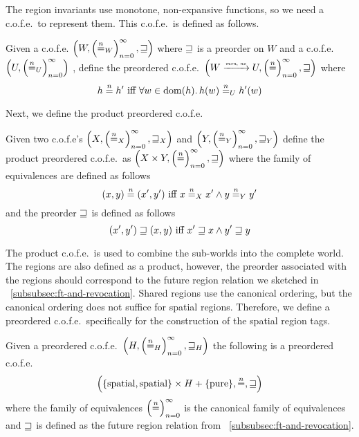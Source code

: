 \begin{jversion}
The region invariants use monotone, non-expansive functions, so we need a c.o.f.e.\ to represent them.
This c.o.f.e.\ is defined as follows.
\begin{lemma}
  Given a c.o.f.e. $\left(W,\left(\nequal[n]_W\right)_{n=0}^{\infty}, \future\right)$ where $\future$ is a preorder on $W$ and a c.o.f.e.\ $\left(U,\left(\nequal[n]_U\right)_{n=0}^{\infty}\right)$ , define the preordered c.o.f.e.\ $\left(W \monnefun U,\left(\nequal[n]\right)_{n=0}^{\infty}, \future \right)$ where 
  \[
    h \nequal h' \text{ iff } \forall w \in \dom(h) \ldotp h(w) \nequal_U h'(w)
  \]
\end{lemma}
Next, we define the product preordered c.o.f.e.\
\begin{lemma}
  Given two c.o.f.e's $\left(X, \left(\nequal_X\right)_{n=0}^{\infty}, \future_X \right)$ and $\left(Y, \left(\nequal_Y\right)_{n=0}^{\infty}, \future_Y \right)$ define the product preordered c.o.f.e.\ as $\left(X \times Y, \left(\nequal\right)_{n=0}^{\infty}, \future \right)$
  where the family of equivalences are defined as follows
  \[
    (x,y) \nequal (x',y') \text{ iff } x \nequal_X x' \wedge y \nequal_Y y'
  \]
  and the preorder $\future$ is defined as follows
  \[
    (x',y') \future (x,y) \text{ iff } x' \future x \wedge y' \future y
  \]
\end{lemma}
The product c.o.f.e.\ is used to combine the sub-worlds into the complete world.
The regions are also defined as a product, however, the preorder associated with the regions should correspond to the future region relation we sketched in \sectionname~\ref{subsubsec:ft-and-revocation}.
Shared regions use the canonical ordering, but the canonical ordering does not suffice for spatial regions.
Therefore, we define a preordered c.o.f.e.\ specifically for the construction of the spatial region tags.
\begin{lemma}
  Given a preordered c.o.f.e.\ $\left( H , \left( \nequal_H \right)_{n=0}^\infty , \future_H\right)$ the following is a preordered c.o.f.e.\ \[\left( \{\spatial,\spatial\} \times H + \{\pure\}, \nequal, \future \right)\]
  where the family of equivalences $\left( \nequal \right)_{n=0}^\infty$ is the canonical family of equivalences and $\future$ is defined as the future region relation from \sectionname~\ref{subsubsec:ft-and-revocation}.  
\end{lemma}


\end{jversion}
